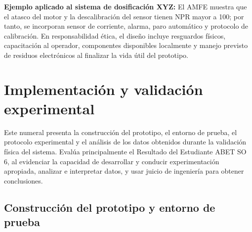 \documentclass[12pt,letterpaper]{report}
\begin{document}
\begin{instrucciones}
\vspace{2mm}
\noindent \textbf{Ejemplo aplicado al sistema de dosificación XYZ:} El AMFE muestra que el atasco del motor y la descalibración del sensor tienen NPR mayor a 100; por tanto, se incorporan sensor de corriente, alarma, paro automático y protocolo de calibración. En responsabilidad ética, el diseño incluye resguardos físicos, capacitación al operador, componentes disponibles localmente y manejo previsto de residuos electrónicos al finalizar la vida útil del prototipo.
\end{instrucciones}

\section{Implementación y validación experimental}

\begin{instrucciones}
Este numeral presenta la construcción del prototipo, el entorno de prueba, el protocolo experimental y el análisis de los datos obtenidos durante la validación física del sistema. Evalúa principalmente el Resultado del Estudiante ABET SO 6, al evidenciar la capacidad de desarrollar y conducir experimentación apropiada, analizar e interpretar datos, y usar juicio de ingeniería para obtener conclusiones.
\end{instrucciones}

\subsection{Construcción del prototipo y entorno de prueba}
\end{document}
